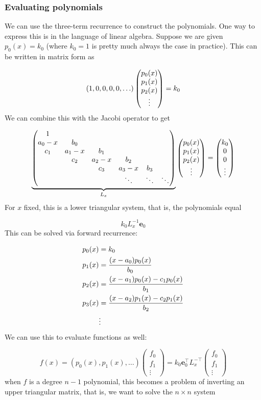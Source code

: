 \documentclass[12pt,landscape]{article}
\def\vc#1{ {\mathbf #1} }
\begin{document}
{\subsubsection{Evaluating polynomials}
We can use the three-term recurrence to construct the polynomials. One way to express this is in the language of linear algebra. Suppose we are given $p_0(x) = k_0$ (where $k_0 = 1$ is pretty much always the case in practice). This can be written in matrix form as

\[
(1,0,0,0,0,\ldots) \begin{pmatrix} p_0(x) \cr p_1(x) \cr p_2(x) \cr \vdots \end{pmatrix} = k_0
\]
We can combine this with the Jacobi operator to get

\[
\underbrace{\begin{pmatrix}
1 \\
a_0-x & b_0 \\
c_1 & a_1-x & b_1 \\
& c_2 & a_2-x & b_2 \cr
&& c_3 & a_3-x & b_3 \cr
&&&\ddots & \ddots & \ddots
\end{pmatrix}}_{L_x} \begin{pmatrix} p_0(x) \cr p_1(x) \cr p_2(x) \cr \vdots \end{pmatrix} = \begin{pmatrix} k_0\cr 0 \cr 0 \cr \vdots \end{pmatrix}
\]
For $x$ fixed, this is a lower triangular system, that is, the polynomials equal

\[
k_0 L_x^{-1} \vc e_0
\]
This  can be solved  via forward recurrence:


\begin{align*}
    p_0(x) &= k_0 \\
    p_1(x) &= {(x-a_0) p_0(x) \over b_0}\\
    p_2(x) &= {(x-a_1) p_0(x) - c_1 p_0(x) \over b_1}\\
    p_3(x) &= {(x-a_2) p_1(x) - c_2 p_1(x) \over b_2}\\
    &\vdots
\end{align*}
We can use this to evaluate functions as well:

\[
f(x) = (p_0(x),p_1(x),\ldots) \begin{pmatrix}f_0 \\ f_1\\ \vdots \end{pmatrix} =
k_0 \vc e_0^\top L_x^{-\top}  \begin{pmatrix}f_0 \\ f_1\\ \vdots \end{pmatrix}
\]
when $f$ is a degree $n-1$ polynomial, this becomes a problem of inverting an upper triangular matrix, that is, we want to solve the $n \times n$ system

}
\end{document}
